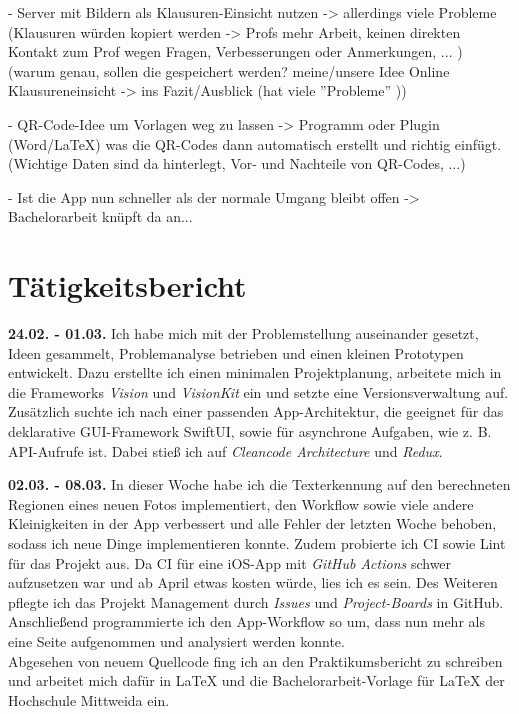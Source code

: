 \documentclass[nomenclature, onesided, 150]{HSMW-Thesis}
\begin{document}
	- Server mit Bildern als Klausuren-Einsicht nutzen -> allerdings viele Probleme (Klausuren würden kopiert werden -> Profs mehr Arbeit, keinen direkten Kontakt zum Prof wegen Fragen, Verbesserungen oder Anmerkungen, ... )
	  (warum genau, sollen die gespeichert werden? meine/unsere Idee Online Klausureneinsicht -> ins Fazit/Ausblick (hat viele ''Probleme'' ))
	
	- QR-Code-Idee um Vorlagen weg zu lassen -> Programm oder Plugin (Word/LaTeX) was die QR-Codes dann automatisch erstellt und richtig einfügt. (Wichtige Daten sind da hinterlegt, Vor- und Nachteile von QR-Codes, ...)
	
	- Ist die App nun schneller als der normale Umgang bleibt offen -> Bachelorarbeit knüpft da an...
	

\Anhang

\chapter{Tätigkeitsbericht}
	\textbf{24.02. - 01.03.}
	Ich habe mich mit der Problemstellung auseinander gesetzt, Ideen gesammelt, Problemanalyse betrieben und einen kleinen Prototypen entwickelt. Dazu erstellte ich einen minimalen Projektplanung, arbeitete mich in die Frameworks \textit{Vision} und \textit{VisionKit} ein und setzte eine Versionsverwaltung auf. Zusätzlich suchte ich nach einer passenden App-Architektur, die geeignet für das deklarative GUI-Framework SwiftUI, sowie für asynchrone Aufgaben, wie z. B. API-Aufrufe ist. Dabei stieß ich auf \textit{Cleancode Architecture} und \textit{Redux}.
	
	\textbf{02.03. - 08.03.} 
	In dieser Woche habe ich die Texterkennung auf den berechneten Regionen eines neuen Fotos implementiert, den Workflow sowie viele andere Kleinigkeiten in der App verbessert und alle Fehler der letzten Woche behoben, sodass ich neue Dinge implementieren konnte. Zudem probierte ich CI sowie Lint für das Projekt aus. Da CI für eine iOS-App mit \textit{GitHub Actions} schwer aufzusetzen war und ab April etwas kosten würde, lies ich es sein. Des Weiteren pflegte ich das Projekt Management durch \textit{Issues} und \textit{Project-Boards} in GitHub. Anschließend programmierte ich den App-Workflow so um, dass nun mehr als eine Seite aufgenommen und analysiert werden konnte. \\ 			
	Abgesehen von neuem Quellcode fing ich an den Praktikumsbericht zu schreiben und arbeitet mich dafür in \LaTeX \xspace und die Bachelorarbeit-Vorlage für \LaTeX \xspace der Hochschule Mittweida ein.
	
\end{document}
